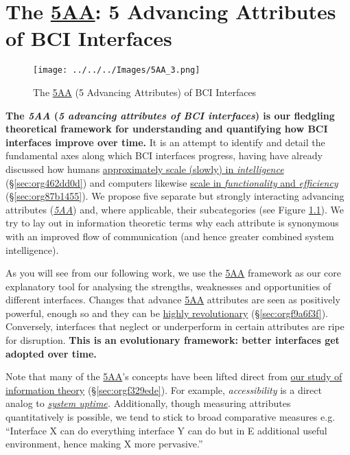 \documentclass[logo,bsc,singlespacing,parskip]{infthesis}
\begin{document}
\chapter{The \hyperref[org7b75b93]{5AA}: 5 Advancing Attributes of BCI Interfaces}
\label{sec:org87adf04}
\begin{figure}[H]
\centering
\texttt{[image: ../../../Images/5AA\_3.png]}
\caption{\label{fig:5AA}The \hyperref[org7b75b93]{5AA} (5 Advancing Attributes) of BCI Interfaces}
\end{figure}

\textbf{The \emph{\label{org7b75b93}5AA} (\emph{5 advancing attributes of BCI interfaces}) is our fledgling theoretical framework for understanding and quantifying how BCI interfaces improve over time.}
It is an attempt to identify and detail the fundamental axes along which BCI interfaces progress, having have already discussed how humans \hyperref[sec:org462dd0d]{approximately scale (slowly) in \emph{intelligence}} (\S \ref{sec:org462dd0d}) and computers likewise \hyperref[sec:org87b1455]{scale in \emph{functionality} and \emph{efficiency}} (\S \ref{sec:org87b1455}).
We propose five separate but strongly interacting advancing attributes (\emph{\hyperref[org7b75b93]{5AA}}) and, where applicable, their subcategories (see Figure \ref{fig:5AA}).
We try to lay out in information theoretic terms why each attribute is synonymous with an improved flow of communication (and hence greater combined system intelligence).

As you will see from our following work, we use the \hyperref[org7b75b93]{5AA} framework as our core explanatory tool for analysing the strengths, weaknesses and opportunities of different interfaces.
Changes that advance \hyperref[org7b75b93]{5AA} attributes are seen as positively powerful, enough so and they can be \hyperref[sec:orgf9a6f3f]{highly revolutionary} (\S \ref{sec:orgf9a6f3f}).
Conversely, interfaces that neglect or underperform in certain attributes are ripe for disruption.
\textbf{This is an evolutionary framework: better interfaces get adopted over time.}

Note that many of the \hyperref[org7b75b93]{5AA}'s concepts have been lifted direct from \hyperref[sec:orgf329ede]{our study of information theory} (\S \ref{sec:orgf329ede}).
For example, \emph{accessibility} is a direct analog to \emph{\hyperref[org97542da]{system uptime}.}
Additionally, though measuring attributes quantitatively is possible, we tend to stick to broad comparative measures e.g. ``Interface X can do everything interface Y can do but in E additional useful environment, hence making X more pervasive.''
\end{document}

